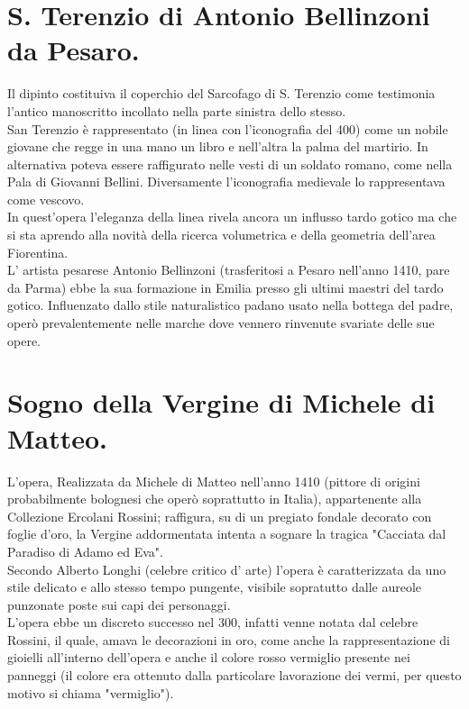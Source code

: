 \documentclass[12pt,a4paper]{article}
\begin{document}
	\section{S. Terenzio di Antonio Bellinzoni da Pesaro.}
	Il dipinto costituiva il coperchio del Sarcofago di S. Terenzio come testimonia l’antico manoscritto incollato nella parte sinistra dello stesso.\\
	San Terenzio è rappresentato (in linea con l'iconografia del 400) come un nobile giovane che regge in una mano un libro e nell'altra la palma del martirio. In alternativa poteva essere raffigurato nelle vesti di un soldato romano, come nella Pala di Giovanni Bellini. Diversamente l’iconografia medievale lo rappresentava come vescovo.\\
	In quest'opera l'eleganza della linea rivela ancora un influsso tardo gotico ma che si sta aprendo alla novità della ricerca volumetrica e della geometria dell'area Fiorentina.\\
	L’ artista pesarese Antonio Bellinzoni (trasferitosi a Pesaro nell'anno 1410, pare da Parma) ebbe la sua formazione in Emilia presso gli ultimi maestri del tardo gotico. Influenzato dallo stile naturalistico padano usato nella bottega del padre, operò prevalentemente nelle marche dove vennero rinvenute svariate delle sue opere.
	
	\section{Sogno della Vergine di Michele di Matteo.}
	L'opera, Realizzata da Michele di Matteo nell'anno 1410 (pittore di origini probabilmente bolognesi che operò soprattutto in Italia), appartenente alla Collezione Ercolani Rossini; raffigura, su di un pregiato fondale decorato con foglie d'oro, la Vergine addormentata intenta a sognare la tragica "Cacciata dal Paradiso di Adamo ed Eva".\\
	Secondo Alberto Longhi (celebre critico d’ arte) l'opera è caratterizzata da uno stile delicato e allo stesso tempo pungente, visibile sopratutto dalle aureole punzonate poste sui capi dei personaggi.\\
	L'opera ebbe un discreto successo nel 300, infatti venne notata dal celebre Rossini, il quale, amava le decorazioni in oro, come anche la rappresentazione di gioielli all'interno dell'opera e anche il colore rosso vermiglio presente nei panneggi (il colore era ottenuto dalla particolare lavorazione dei vermi, per questo motivo si chiama "vermiglio").  
	
\end{document}
